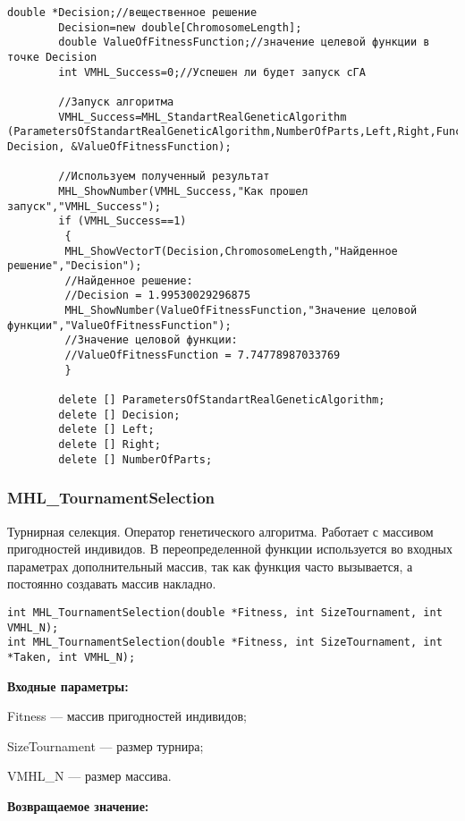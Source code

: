 \documentclass[a4paper,12pt]{article}
\begin{document}
\begin{lstlisting}[label=code_use_MHL_StandartRealGeneticAlgorithm,caption=Пример использования]
        double *Decision;//вещественное решение
        Decision=new double[ChromosomeLength];
        double ValueOfFitnessFunction;//значение целевой функции в точке Decision
        int VMHL_Success=0;//Успешен ли будет запуск cГА

        //Запуск алгоритма
        VMHL_Success=MHL_StandartRealGeneticAlgorithm (ParametersOfStandartRealGeneticAlgorithm,NumberOfParts,Left,Right,Func2, Decision, &ValueOfFitnessFunction);

        //Используем полученный результат
        MHL_ShowNumber(VMHL_Success,"Как прошел запуск","VMHL_Success");
        if (VMHL_Success==1)
         {
         MHL_ShowVectorT(Decision,ChromosomeLength,"Найденное решение","Decision");
         //Найденное решение:
         //Decision = 1.99530029296875
         MHL_ShowNumber(ValueOfFitnessFunction,"Значение целовой функции","ValueOfFitnessFunction");
         //Значение целовой функции:
         //ValueOfFitnessFunction = 7.74778987033769
         }

        delete [] ParametersOfStandartRealGeneticAlgorithm;
        delete [] Decision;
        delete [] Left;
        delete [] Right;
        delete [] NumberOfParts;
\end{lstlisting}

\subsubsection{MHL\_TournamentSelection}\label{MHL_TournamentSelection}

Турнирная селекция. Оператор генетического алгоритма. Работает с массивом пригодностей индивидов. В переопределенной функции используется во входных параметрах дополнительный массив, так как функция часто вызывается, а постоянно создавать массив накладно.


\begin{lstlisting}[label=code_syntax_MHL_TournamentSelection,caption=Синтаксис]
int MHL_TournamentSelection(double *Fitness, int SizeTournament, int VMHL_N);
int MHL_TournamentSelection(double *Fitness, int SizeTournament, int *Taken, int VMHL_N);
\end{lstlisting}

\textbf{Входные параметры:}
 
 Fitness --- массив пригодностей индивидов;
 
 SizeTournament --- размер турнира;
 
 VMHL\_N --- размер массива.

\textbf{Возвращаемое значение:} 
\end{document}
